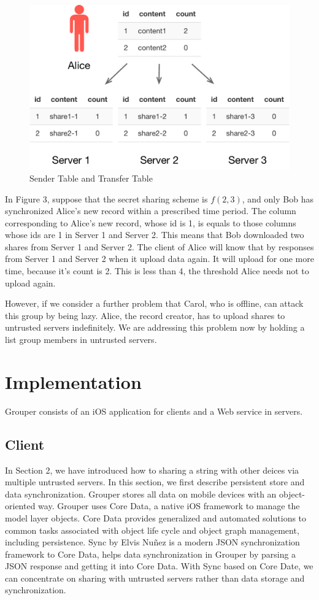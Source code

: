 \documentclass[twocolumn,10pt]{article}
\begin{document}
\begin{figure}[t]
	\centering
	\includegraphics[scale=0.4]{sync_table}
	\caption{Sender Table and Transfer Table}
\end{figure}

In Figure 3, suppose that the secret sharing scheme is $f(2, 3)$, and only Bob has synchronized Alice's new record within a prescribed time period. The column corresponding to Alice's new record, whose id is 1, is equals to those columns whose ids are 1 in Server 1 and Server 2. This means that Bob downloaded two shares from Server 1 and Server 2. The client of Alice will know that by responses from Server 1 and Server 2 when it upload data again. It will upload for one more time, because it's count is 2. This is less than 4, the threshold Alice needs not to upload again.

However, if we consider a further problem that Carol, who is offline, can attack this group by being lazy. Alice, the record creator, has to upload shares to untrusted servers indefinitely. We are addressing this problem now by holding a list group members in untrusted servers.

\section{Implementation}
Grouper consists of an iOS application for clients and a Web service in servers.

\subsection{Client}
In Section 2, we have introduced how to sharing a string with other deices via multiple untrusted servers. In this section, we first describe persistent store and data synchronization. Grouper stores all data on mobile devices with an object-oriented way. Grouper uses Core Data\cite{coredata}, a native iOS framework to manage the model layer objects. Core Data provides generalized and automated solutions to common tasks associated with object life cycle and object graph management, including persistence. Sync\cite{sync} by Elvis Nu\~{n}ez is a modern JSON synchronization framework to Core Data, helps data synchronization in Grouper by parsing a JSON response and getting it into Core Data. With Sync based on Core Date, we can concentrate on sharing with untrusted servers rather than data storage and synchronization.
\end{document}
